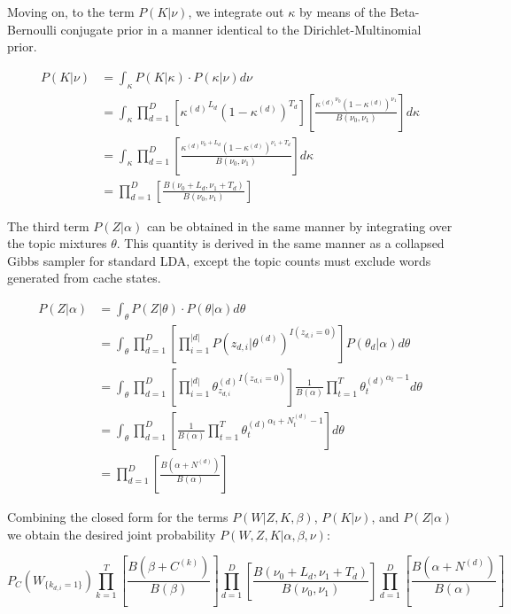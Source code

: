 Moving on, to  the term $P(K|\nu)$, we integrate out $\kappa$ by means of the Beta-Bernoulli conjugate prior in a manner identical to the Dirichlet-Multinomial prior.

\begin{align}
P(K|\nu) &= \int_{\kappa} P(K|\kappa)\cdot P(\kappa|\nu) d\nu\\
 &= \int_{\kappa} \prod_{d=1}^D  \left [ {\kappa^{(d)}}^{L_d} (1-\kappa^{(d)})^{T_d} \right] \left [ \frac{{\kappa^{(d)}}^{\nu_0} (1-\kappa^{(d)})^{\nu_1}}{B(\nu_0,\nu_1)} \right] d\kappa \\
 &= \int_{\kappa} \prod_{d=1}^D  \left [ \frac{{\kappa^{(d)}}^{\nu_0+L_d} (1-\kappa^{(d)})^{\nu_1+T_d}}{B(\nu_0,\nu_1)} \right] d\kappa \\
 &= \prod_{d=1}^D  \left [ \frac{B(\nu_0+L_d,\nu_1+T_d)}{B(\nu_0,\nu_1)} \right] 
\end{align}
 
 
The third term $P(Z|\alpha)$ can be obtained in the same manner by integrating over the topic mixtures $\theta$.  This quantity is derived in the same manner as a collapsed Gibbs sampler for standard LDA, except the topic counts must exclude words generated from cache states.
  
\begin{align}
 P(Z|\alpha) &= \int_{\theta} P(Z|\theta)\cdot P(\theta|\alpha) d\theta \\
  &= \int_{\theta} \prod_{d=1}^{D} \left [ \prod_{i=1}^{|d|} P(z_{d,i}|\theta^{(d)})^{I(z_{d,i}=0)} \right ] P(\theta_d|\alpha) d\theta \\
  &= \int_{\theta} \prod_{d=1}^{D} \left [ \prod_{i=1}^{|d|} {\theta^{(d)}_{z_{d,i}}}^{I(z_{d,i}=0)} \right ]\frac{1}{B(\alpha)} \prod_{t=1}^T {\theta^{(d)}_t}^{\alpha_t - 1}  d\theta \\
  &= \int_{\theta} \prod_{d=1}^{D} \left [ \frac{1}{B(\alpha)} \prod_{t=1}^T {\theta^{(d)}_t}^{\alpha_t + N^{(d)}_{t} - 1}  \right ] d\theta \\
  &= \prod_{d=1}^{D} \left [ \frac{B(\alpha + N^{(d)})}{B(\alpha)}  \right ] \label{zalpha}
\end{align}
 

Combining the closed form for the terms $P(W|Z,K,\beta)$, $P(K|\nu)$, and $ P(Z|\alpha)$ we obtain the desired joint probability $P(W,Z,K|\alpha,\beta,\nu)$:

\begin{equation}
P_C(W_{\{k_{d,i}=1\}}) \prod_{k=1}^T \left [ \frac{B(\beta + C^{(k)})}{B(\beta)} \right ] \prod_{d=1}^D  \left [ \frac{B(\nu_0+L_d,\nu_1+T_d)}{B(\nu_0,\nu_1)} \right ] \prod_{d=1}^{D} \left [ \frac{B(\alpha +  N^{(d)})}{B(\alpha)}  \right ] 
\end{equation}

